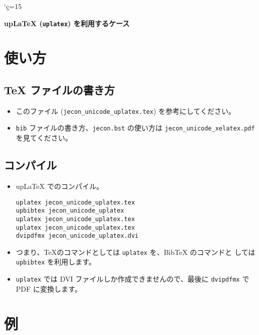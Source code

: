 \documentclass[a4j,10pt]{ujarticle}
\begin{document}
\kcatcode`ç=15%

\begin{flushleft}
 {\Large \textbf{upLaTeX (\texttt{uplatex}) を利用するケース}}
\end{flushleft}

\vspace{1em}

\section{使い方}

\subsection{TeX ファイルの書き方}

\begin{itemize}
 \item このファイル (\texttt{jecon\_unicode\_uplatex.tex}) を参考にしてください。
 \item \texttt{bib} ファイルの書き方、\texttt{jecon.bst} の使い方は
       \texttt{jecon\_unicode\_xelatex.pdf} を見てください。
\end{itemize}

\subsection{コンパイル}

\begin{itemize}
 \item upLaTeX でのコンパイル。
\begin{verbatim}
uplatex jecon_unicode_uplatex.tex
upbibtex jecon_unicode_uplatex
uplatex jecon_unicode_uplatex.tex               
uplatex jecon_unicode_uplatex.tex
dvipdfmx jecon_unicode_uplatex.dvi
\end{verbatim}
 \item つまり、\TeX のコマンドとしては \texttt{uplatex} を、BibTeX のコマンドと
       しては \texttt{upbibtex} を利用します。
 \item \texttt{uplatex} では DVI ファイルしか作成できませんので、最後に
       \texttt{dvipdfmx} で PDF に変換します。
\end{itemize}

\section{例}



\nocite{*}



%

\end{document}
